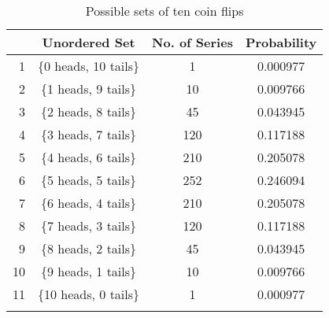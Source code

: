 \begin{table}
\caption{Possible sets of ten coin flips}
\label{tab:tencoinflips}
\begin{tabular}[t]{rccS[table-format=1.6,round-precision=6]}
\lsptoprule & Unordered Set & No. of Series & {Probability}\\
 & \{0 heads, 10 tails\} & 1 & 0.000977 \\
2 & \{1 heads, 9 tails\} & 10 & 0.009766 \\
3 & \{2 heads, 8 tails\} & 45 & 0.043945 \\
4 & \{3 heads, 7 tails\} & 120 & 0.117188 \\
5 & \{4 heads, 6 tails\} & 210 & 0.205078 \\
6 & \{5 heads, 5 tails\} & 252 & 0.246094 \\
7 & \{6 heads, 4 tails\} & 210 & 0.205078 \\
8 & \{7 heads, 3 tails\} & 120 & 0.117188 \\
9 & \{8 heads, 2 tails\} & 45 & 0.043945 \\
10 & \{9 heads, 1 tails\} & 10 & 0.009766 \\
11 & \{10 heads, 0 tails\} & 1 & 0.000977 \\
\lspbottomrule
\end{tabular}
\end{table}
